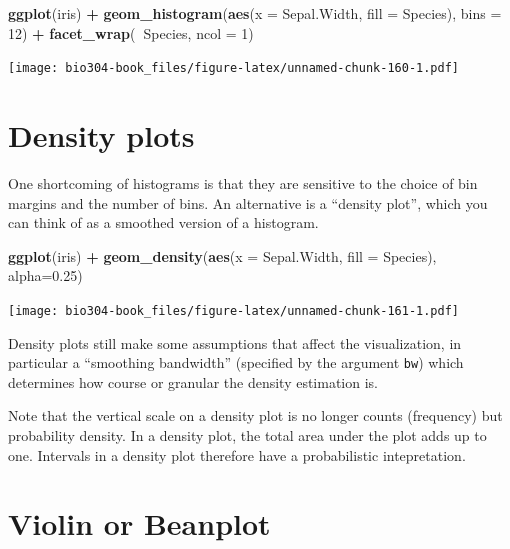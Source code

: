 \documentclass[]{book}
\newenvironment{Shaded}{\begin{snugshade}}{\end{snugshade}}
\newcommand{\DataTypeTok}[1]{\textcolor[rgb]{0.13,0.29,0.53}{#1}}
\newcommand{\DecValTok}[1]{\textcolor[rgb]{0.00,0.00,0.81}{#1}}
\newcommand{\FloatTok}[1]{\textcolor[rgb]{0.00,0.00,0.81}{#1}}
\newcommand{\KeywordTok}[1]{\textcolor[rgb]{0.13,0.29,0.53}{\textbf{#1}}}
\newcommand{\NormalTok}[1]{#1}
\newcommand{\OperatorTok}[1]{\textcolor[rgb]{0.81,0.36,0.00}{\textbf{#1}}}
\newcommand{\StringTok}[1]{\textcolor[rgb]{0.31,0.60,0.02}{#1}}
\theoremstyle{definition}
\theoremstyle{definition}
\theoremstyle{definition}
\theoremstyle{remark}
\begin{document}
\begin{Shaded}
\begin{Highlighting}[]
\KeywordTok{ggplot}\NormalTok{(iris) }\OperatorTok{+}\StringTok{ }
\StringTok{  }\KeywordTok{geom_histogram}\NormalTok{(}\KeywordTok{aes}\NormalTok{(}\DataTypeTok{x =}\NormalTok{ Sepal.Width, }\DataTypeTok{fill =}\NormalTok{ Species), }\DataTypeTok{bins =} \DecValTok{12}\NormalTok{) }\OperatorTok{+}\StringTok{ }
\StringTok{  }\KeywordTok{facet_wrap}\NormalTok{(}\OperatorTok{~}\NormalTok{Species, }\DataTypeTok{ncol =} \DecValTok{1}\NormalTok{)}
\end{Highlighting}
\end{Shaded}

\texttt{[image: bio304-book\_files/figure-latex/unnamed-chunk-160-1.pdf]}

\hypertarget{density-plots}{%
\section{Density plots}\label{density-plots}}

One shortcoming of histograms is that they are sensitive to the choice
of bin margins and the number of bins. An alternative is a ``density
plot'', which you can think of as a smoothed version of a histogram.

\begin{Shaded}
\begin{Highlighting}[]
\KeywordTok{ggplot}\NormalTok{(iris) }\OperatorTok{+}\StringTok{ }
\StringTok{  }\KeywordTok{geom_density}\NormalTok{(}\KeywordTok{aes}\NormalTok{(}\DataTypeTok{x =}\NormalTok{ Sepal.Width, }\DataTypeTok{fill =}\NormalTok{ Species), }\DataTypeTok{alpha=}\FloatTok{0.25}\NormalTok{)}
\end{Highlighting}
\end{Shaded}

\texttt{[image: bio304-book\_files/figure-latex/unnamed-chunk-161-1.pdf]}

Density plots still make some assumptions that affect the visualization,
in particular a ``smoothing bandwidth'' (specified by the argument
\texttt{bw}) which determines how course or granular the density
estimation is.

Note that the vertical scale on a density plot is no longer counts
(frequency) but probability density. In a density plot, the total area
under the plot adds up to one. Intervals in a density plot therefore
have a probabilistic intepretation.

\hypertarget{violin-or-beanplot}{%
\section{Violin or Beanplot}\label{violin-or-beanplot}}
\end{document}
